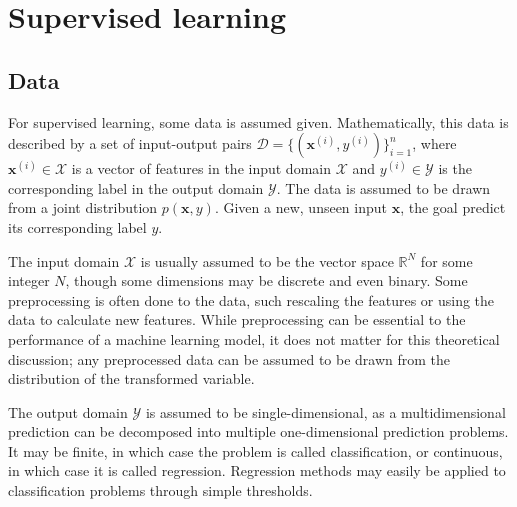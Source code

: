 \section{Supervised learning}
\label{sec:supervised_learning}

\subsection{Data}
For supervised learning, some data is assumed given.
Mathematically, this data is described by a set of input-output pairs $\mathcal{D} = \{(\bm{x}^{(i)}, y^{(i)})\}_{i=1}^n$, where $\bm{x}^{(i)} \in\mathcal{X}$ is a vector of features in the input domain $\mathcal{X}$ and $y^{(i)}\in\mathcal{Y}$ is the corresponding label in the output domain $\mathcal{Y}$.
The data is assumed to be drawn from a joint distribution $p(\bm{x}, y)$.
Given a new, unseen input $\bm{x}$, the goal predict its corresponding label $y$.

The input domain $\mathcal{X}$ is usually assumed to be the vector space $\mathbb{R}^N$ for some integer $N$, though some dimensions may be discrete and even binary.
Some preprocessing is often done to the data, such rescaling the features or using the data to calculate new features.
While preprocessing can be essential to the performance of a machine learning model, it does not matter for this theoretical discussion; any preprocessed data can be assumed to be drawn from the distribution of the transformed variable.

The output domain $\mathcal{Y}$ is assumed to be single-dimensional, as a multidimensional prediction can be decomposed into multiple one-dimensional prediction problems.
It may be finite, in which case the problem is called classification, or continuous, in which case it is called regression.
Regression methods may easily be applied to classification problems through simple thresholds.

